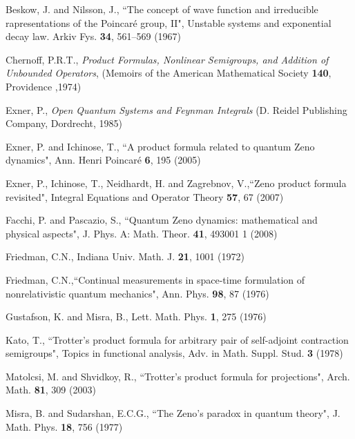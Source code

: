 \documentclass[aip,jmp
]{revtex4}
\theoremstyle{definition}
\begin{document}
\begin{thebibliography}{20}
%
%

 Beskow, J. and Nilsson, J.,
{``The concept of wave function and irreducible rapresentations of
the Poincar{\'e} group, II"}, Unstable systems and exponential
decay law. Arkiv Fys.
  \textbf{34}, 561--569 (1967)


Chernoff, P.R.T.,
\textit{Product Formulas, Nonlinear Semigroups,
and Addition of Unbounded Operators},
(Memoirs of the American Mathematical Society \textbf{140}, Providence ,1974)


Exner, P.,
\textit{Open Quantum Systems and Feynman Integrals}
(D. Reidel Publishing Company, Dordrecht, 1985)


Exner, P. and Ichinose, T.,
{``A product formula related to quantum Zeno dynamics"}, Ann. Henri
Poincar\'e
  \textbf{6}, 195 (2005)


Exner, P., Ichinose, T., Neidhardt, H. and Zagrebnov, V.,{``Zeno product formula revisited"},
 Integral Equations and Operator Theory
\textbf{57}, 67 (2007)


Facchi, P. and Pascazio, S., {``Quantum Zeno dynamics: mathematical and physical aspects"}, J. Phys. A: Math. Theor. \textbf{41}, 493001 1 (2008)


Friedman, C.N.,
Indiana Univ. Math. J. \textbf{21}, 1001 (1972)

Friedman, C.N.,{``Continual measurements in space-time formulation of nonrelativistic quantum mechanics"},
Ann. Phys. \textbf{98}, 87 (1976)

Gustafson, K. and Misra, B.,
Lett. Math. Phys. \textbf{1}, 275  (1976)


Kato, T.,
{``Trotter's product formula for arbitrary pair of self-adjoint contraction semigroups"},
Topics in functional analysis, Adv. in Math. Suppl. Stud.
\textbf{3} (1978)


Matolcsi, M. and Shvidkoy, R.,
{``Trotter's product formula for projections"},
Arch. Math. \textbf{81}, 309 (2003)


Misra, B. and Sudarshan, E.C.G.,
{``The Zeno's paradox in quantum theory"}, J. Math. Phys.
  \textbf{18}, 756 (1977)


\end{thebibliography}
\end{document}
